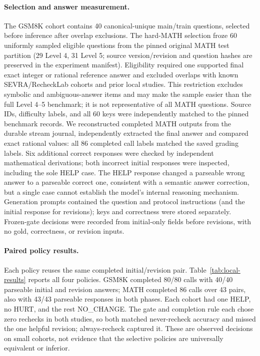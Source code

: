 \documentclass[conference]{IEEEtran}
\begin{document}
\paragraph{Selection and answer measurement.} The GSM8K cohort contains 40 canonical-unique main/train questions, selected before inference after overlap exclusions. The hard-MATH selection froze 60 uniformly sampled eligible questions from the pinned original MATH test partition (29 Level 4, 31 Level 5; source version/revision and question hashes are preserved in the experiment manifest). Eligibility required one supported final exact integer or rational reference answer and excluded overlaps with known SEVRA/RecheckLab cohorts and prior local studies. This restriction excludes symbolic and ambiguous-answer items and may make the sample easier than the full Level 4--5 benchmark; it is not representative of all MATH questions. Source IDs, difficulty labels, and all 60 keys were independently matched to the pinned benchmark records. We reconstructed completed MATH outputs from the durable stream journal, independently extracted the final answer and compared exact rational values: all 86 completed call labels matched the saved grading labels. Six additional correct responses were checked by independent mathematical derivations; both incorrect initial responses were inspected, including the sole HELP case. The HELP response changed a parseable wrong answer to a parseable correct one, consistent with a semantic answer correction, but a single case cannot establish the model's internal reasoning mechanism. Generation prompts contained the question and protocol instructions (and the initial response for revisions); keys and correctness were stored separately. Frozen-gate decisions were recorded from initial-only fields before revisions, with no gold, correctness, or revision inputs.

\paragraph{Paired policy results.} Each policy reuses the same completed initial/revision pair. Table~\ref{tab:local-results} reports all four policies. GSM8K completed 80/80 calls with 40/40 parseable initial and revision answers; MATH completed 86 calls over 43 pairs, also with 43/43 parseable responses in both phases. Each cohort had one HELP, no HURT, and the rest NO\_CHANGE. The gate and completion rule each chose zero rechecks in both studies, so both matched never-recheck accuracy and missed the one helpful revision; always-recheck captured it. These are observed decisions on small cohorts, not evidence that the selective policies are universally equivalent or inferior.
\end{document}
